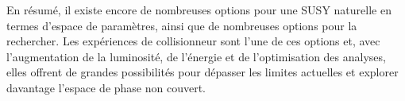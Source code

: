 En résumé, il existe encore de nombreuses options pour une SUSY naturelle en termes d'espace de paramètres, ainsi que de nombreuses options pour la rechercher. Les expériences de collisionneur sont l'une de ces options et, avec l'augmentation de la luminosité, de l'énergie et de l'optimisation des analyses, elles offrent de grandes possibilités pour dépasser les limites actuelles et explorer davantage l'espace de phase non couvert.

